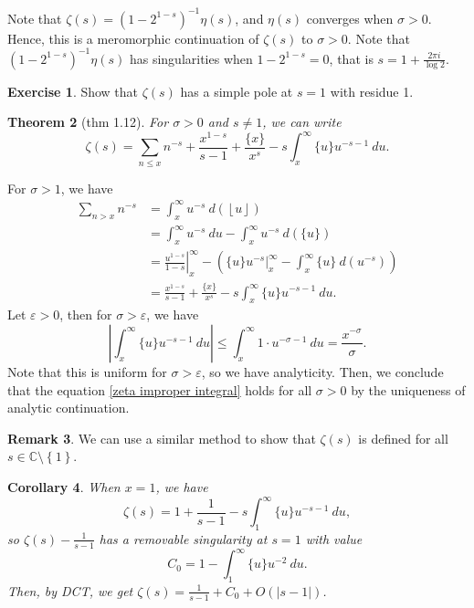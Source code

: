 \documentclass[11pt]{article}
\newtheorem{thm}{Theorem}[subsection]
\newtheorem{cor}[thm]{Corollary}
\theoremstyle{definition}
\newtheorem{exe}[thm]{Exercise}
\newtheorem{remark}[thm]{Remark}
\newcommand{\sm}[0]{\setminus}
\newcommand{\set}[1]{\left\{ #1 \right\}}
\newcommand{\floor}[1]{\left\lfloor #1 \right\rfloor}
\newcommand{\s}[0]{\sigma}
\newcommand{\e}[0]{\varepsilon}
\newcommand{\abs}[1]{\left\lvert#1\right\rvert} %
\newcommand{\CC}{\mathbb{C}}
\begin{document}

Note that $\zeta(s)=(1-2^{1-s})^{-1}\eta(s)$, and $\eta(s)$ converges when $\s>0$. Hence,
this is a meromorphic continuation of $\zeta(s)$ to $\s>0$. Note that
$(1-2^{1-s})^{-1}\eta(s)$ has singularities when $1-2^{1-s}=0$, that is $s=1+\frac{2\pi
i}{\log2}$.

\begin{exe}
Show that $\zeta(s)$ has a simple pole at $s=1$ with residue 1.
\end{exe}

\begin{thm}[thm 1.12]\label{thm:1.12}
For $\s>0$ and $s\neq1$, we can write
\begin{equation}
\zeta(s) = \sum_{n\le x}n^{-s} + \frac{x^{1-s}}{s-1} + \frac{\{x\}}{x^s}
- s \int_x^\infty \{u\}u^{-s-1} ~du .
\label{zeta improper integral}
\end{equation}
\end{thm}
\proof
For $\s>1$, we have
\begin{align*}
\sum_{n>x}n^{-s} &= \int_x^\infty u^{-s}~d\left(\floor{u}\right) \\
&= \int_x^\infty u^{-s}~du - \int_x^\infty u^{-s}~d\left(\{u\}\right) \\
&= \left. \frac{u^{1-s}}{1-s}\right|_x^\infty
- \left(\left.\{u\}u^{-s}\right|_x^\infty - \int_x^\infty\{u\}~d(u^{-s})\right) \\
&= \frac{x^{1-s}}{s-1} + \frac{\{x\}}{x^s} - s \int_x^\infty \{u\} u^{-s-1} ~du .
\end{align*}
Let $\e>0$, then for $\s>\e$, we have
\[
\abs{\int_x^\infty \{u\}u^{-s-1} ~du}
\le \int_x^\infty 1\cdot u^{-\s-1} ~du
= \frac{x^{-\s}}{\s} .
\]
Note that this is uniform for $\s>\e$, so we have analyticity. Then, we conclude that the
equation \ref{zeta improper integral} holds for all $\s>0$ by the uniqueness of analytic
continuation.
\qedhere

\begin{remark}
We can use a similar method to show that $\zeta(s)$ is defined for all $s\in\CC\sm\set{1}$.
\end{remark}

\begin{cor}
When $x=1$, we have
\[
\zeta(s) = 1 + \frac1{s-1} - s\int_1^\infty \{u\}u^{-s-1} ~du ,
\]
so $\zeta(s)-\frac1{s-1}$ has a removable singularity at $s=1$ with value
\[
C_0 = 1 - \int_1^\infty \{u\} u^{-2} ~du .
\]
Then, by DCT, we get $\zeta(s)=\frac1{s-1}+C_0 + O(\abs{s-1})$.
\end{cor}
\end{document}
